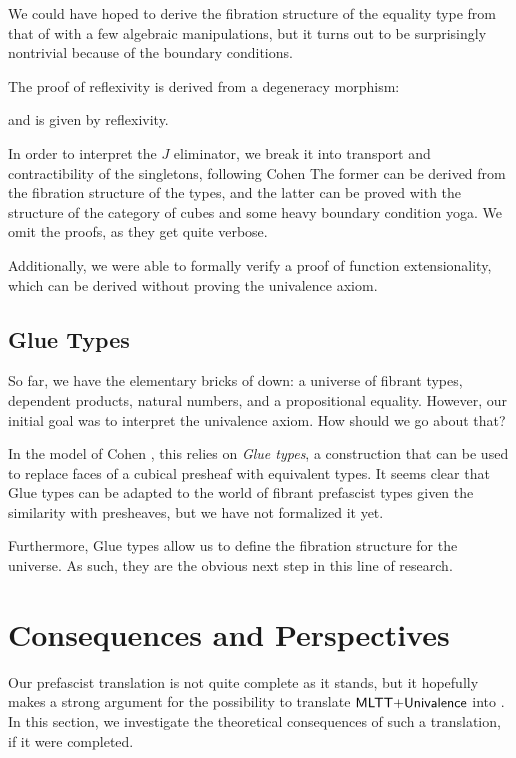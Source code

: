 We could have hoped to derive the fibration structure of the equality type 
from that of  with a few algebraic manipulations, but it turns
out to be surprisingly nontrivial because of the boundary conditions.

The proof of reflexivity is derived from a degeneracy morphism: 


and  is given by reflexivity.

In order to interpret the \( J \) eliminator, we break it into 
transport and contractibility of the singletons, following Cohen \etal
% 
The former can be derived from the fibration structure of the types, and the
latter can be proved with the structure of the category of cubes and some
heavy boundary condition yoga.
% 
We omit the proofs, as they get quite verbose.

Additionally, we were able to formally verify a proof of function 
extensionality, which can be derived without proving the univalence axiom.

\subsection{Glue Types}

So far, we have the elementary bricks of \MLTT down: a universe of fibrant types,
dependent products, natural numbers, and a propositional equality.
% 
However, our initial goal was to interpret the univalence axiom. How should we go 
about that?

In the model of Cohen \etal, this relies on \emph{Glue types}, a construction 
that can be used to replace faces of a cubical presheaf with equivalent types.
% 
It seems clear that Glue types can be adapted to the world of fibrant prefascist 
types given the similarity with presheaves, but we have not formalized it yet.

Furthermore, Glue types allow us to define the fibration structure for the 
universe. As such, they are the obvious next step in this line of research.

\section{Consequences and Perspectives}
\label{sec:cubical-perspectives}

Our prefascist translation is not quite complete as it stands, but it hopefully 
makes a strong argument for the possibility to translate 
\( \mathsf{MLTT}{+}\mathsf{Univalence} \) into \SetoidCCplus.
% 
In this section, we investigate the theoretical consequences of such a 
translation, if it were completed.

